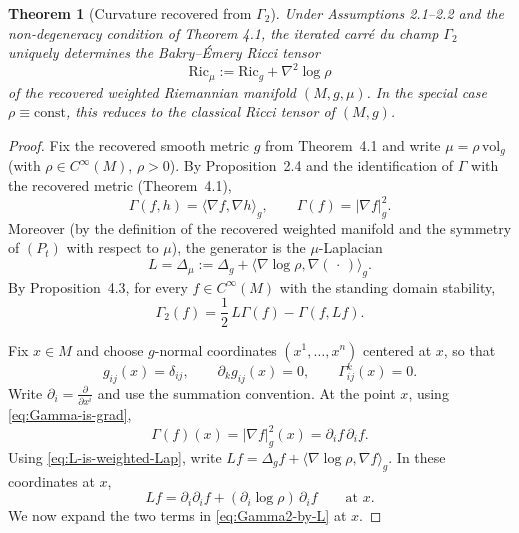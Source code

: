 \documentclass[11pt]{amsart}
\newtheorem{theorem}{Theorem}[section]
\theoremstyle{definition}
\theoremstyle{remark}
\begin{document}
\begin{theorem}[Curvature recovered from $\Gamma_2$]\label{thm:recover-curvature}
Under Assumptions 2.1–2.2 and the non-degeneracy condition of Theorem 4.1,
the iterated carré du champ $\Gamma_2$ uniquely determines the Bakry--Émery
Ricci tensor
\[
\mathrm{Ric}_\mu := \mathrm{Ric}_g + \nabla^2\log\rho
\]
of the recovered weighted Riemannian manifold $(M,g,\mu)$.
In the special case $\rho\equiv\mathrm{const}$, this reduces to the classical
Ricci tensor of $(M,g)$.
\end{theorem}
\begin{proof}
Fix the recovered smooth metric $g$ from Theorem~4.1 and write $\mu=\rho\,\mathrm{vol}_g$
(with $\rho\in C^\infty(M)$, $\rho>0$). By Proposition~2.4 and the identification of $\Gamma$
with the recovered metric (Theorem~4.1),
\begin{equation}\label{eq:Gamma-is-grad}
\Gamma(f,h)=\langle \nabla f,\nabla h\rangle_g,\qquad \Gamma(f)=|\nabla f|_g^2 .
\end{equation}
Moreover (by the definition of the recovered weighted manifold and the symmetry of $(P_t)$ with
respect to $\mu$), the generator is the $\mu$-Laplacian
\begin{equation}\label{eq:L-is-weighted-Lap}
L=\Delta_\mu:=\Delta_g+\langle \nabla\log\rho,\nabla(\,\cdot\,)\rangle_g .
\end{equation}
By Proposition~4.3, for every $f\in C^\infty(M)$ with the standing domain stability,
\begin{equation}\label{eq:Gamma2-by-L}
\Gamma_2(f)=\frac12\,L\Gamma(f)-\Gamma(f,Lf).
\end{equation}

Fix $x\in M$ and choose $g$-normal coordinates $(x^1,\dots,x^n)$ centered at $x$, so that
\[
g_{ij}(x)=\delta_{ij},\qquad \partial_k g_{ij}(x)=0,\qquad \Gamma^k_{ij}(x)=0 .
\]
Write $\partial_i=\frac{\partial}{\partial x^i}$ and use the summation convention.
At the point $x$, using \eqref{eq:Gamma-is-grad},
\[
\Gamma(f)(x)=|\nabla f|_g^2(x)=\partial_i f\,\partial_i f.
\]
Using \eqref{eq:L-is-weighted-Lap}, write $Lf=\Delta_g f+\langle \nabla\log\rho,\nabla f\rangle_g$.
In these coordinates at $x$,
\begin{equation}\label{eq:L-local}
Lf
=\partial_i\partial_i f + (\partial_i\log\rho)\,\partial_i f
\qquad\text{at }x.
\end{equation}
We now expand the two terms in \eqref{eq:Gamma2-by-L} at $x$.


\end{proof}
\end{document}
